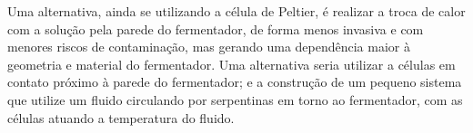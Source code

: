 Uma alternativa, ainda se utilizando a célula de Peltier, é realizar a troca de calor com a solução pela parede do fermentador, de forma menos invasiva e com menores riscos de contaminação, mas gerando uma dependência maior à geometria e material do fermentador. Uma alternativa seria utilizar a células em contato próximo à parede do fermentador; e a construção de um pequeno sistema que utilize um fluido circulando por serpentinas em torno ao fermentador, com as células atuando a temperatura do fluido.

